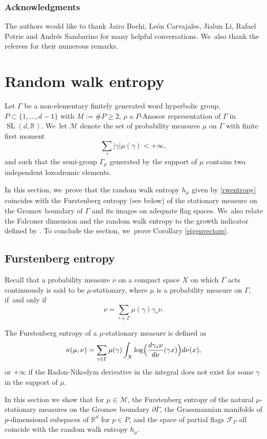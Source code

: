 \documentclass[JEP,XML,SOM,Unicode,NoEqCountersInSection,published]{cedram}
\newcommand{\R}{\mathbb{R}}
\newcommand{\F}{\mathcal{F}}
\newcommand{\M}{\mathcal M}
\let\G\Gamma
\let\g\gamma
\DeclareMathOperator{\SL}{SL}
\begin{document}
\subsubsection*{Acknowledgments}
The authors would like to thank Jairo Bochi, León Carvajales, Jialun Li, Rafael Potrie and Andrés Sambarino for many helpful conversations. We~also thank the referees for their numerous remarks.

\section{Random walk entropy}

Let \(\G\) be a non-elementary finitely generated word hyperbolic group, \(P \subset \lbrace 1,\ldots, d-1 \rbrace\) with \(M:= \#P \ge 2 \), \(\rho \) a \(P\)-Anosov representation of \(\G\) in \(\SL (d,\R) \). We~let \(\mathcal{M}\) denote the set of probability measures \(\mu\) on \(\Gamma\) with finite first moment
\[
\sum_{\gamma} |\gamma| \mu(\gamma) < +\infty,
\]
and such that the semi-group \(\Gamma_\mu\) generated by the support of \(\mu\) contains two independent loxodromic elements.

In this section, we~prove that the random walk entropy \(h_\mu \) given by \eqref{rwentropy} coincides with the Furstenberg entropy (see below) of the stationary measure on the Gromov boundary of \(\Gamma\) and its images on adequate flag spaces. We~also relate the Falconer dimension and the random walk entropy to the growth indicator defined by \cite{Qui02a}. To conclude the section, we~prove Corollary \ref{eigenvectors}.

\subsection{Furstenberg entropy}

Recall that a probability measure \(\nu\) on a compact space \(X\) on which \(\Gamma\) acts continuously is said to be \(\mu\)-stationary, where \(\mu\) is a probability measure on \(\Gamma\), if~and only if
\[
\nu = \sum_{\gamma \in \Gamma}\mu(\gamma)\gamma_*\nu.
\]

The Furstenberg entropy of a \(\mu\)-stationary measure is defined as
\[
\kappa(\mu,\nu) = \sum_{\gamma \in \Gamma} \mu(\gamma) \int_{X} \log\Bigl(\frac{d\gamma_*\nu}{d\nu}(\g x)\Bigr)d\nu(x),
\]
or \(+\infty\) if the Radon-Nikodym derivative in the integral does not exist for some \(\gamma\) in the support of \(\mu\).

In this section we show that for \(\mu \in \M\), the Furstenberg entropy of the natural \(\mu\)-stationary measures on the Gromov boundary \(\partial\Gamma\), the Grassmannian manifolds of \(p\)-dimensional subspaces of \(\R^d\) for \(p \in P\), and the space of partial flags \(\F_P\) all coincide with the random walk entropy \(h_\mu\).
\end{document}
